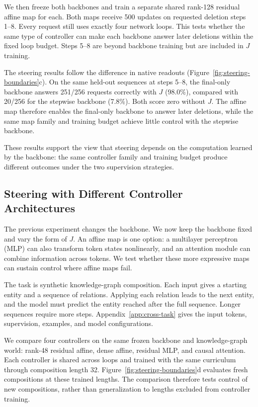 \documentclass{article}
\begin{document}
We then freeze both backbones and train a separate shared rank-128 residual affine map for each. Both maps receive 500 updates on requested deletion steps 1--8. Every request still uses exactly four network loops. This tests whether the same type of controller can make each backbone answer later deletions within the fixed loop budget. Steps 5--8 are beyond backbone training but are included in $J$ training.

The steering results follow the difference in native readouts (Figure~\ref{fig:steering-boundaries}c). On the same held-out sequences at steps 5--8, the final-only backbone answers 251/256 requests correctly with $J$ (98.0\%), compared with 20/256 for the stepwise backbone (7.8\%). Both score zero without $J$. The affine map therefore enables the final-only backbone to answer later deletions, while the same map family and training budget achieve little control with the stepwise backbone.

These results support the view that steering depends on the computation learned by the backbone: the same controller family and training budget produce different outcomes under the two supervision strategies.

\subsection{Steering with Different Controller Architectures}
\label{sec:complexity-boundary}
The previous experiment changes the backbone. We now keep the backbone fixed and vary the form of $J$. An affine map is one option: a multilayer perceptron (MLP) can also transform token states nonlinearly, and an attention module can combine information across tokens. We test whether these more expressive maps can sustain control where affine maps fail.

The task is synthetic knowledge-graph composition. Each input gives a starting entity and a sequence of relations. Applying each relation leads to the next entity, and the model must predict the entity reached after the full sequence. Longer sequences require more steps. Appendix~\ref{app:cross-task} gives the input tokens, supervision, examples, and model configurations.

We compare four controllers on the same frozen backbone and knowledge-graph world: rank-48 residual affine, dense affine, residual MLP, and causal attention. Each controller is shared across loops and trained with the same curriculum through composition length 32. Figure~\ref{fig:steering-boundaries}d evaluates fresh compositions at these trained lengths. The comparison therefore tests control of new compositions, rather than generalization to lengths excluded from controller training.
\end{document}
